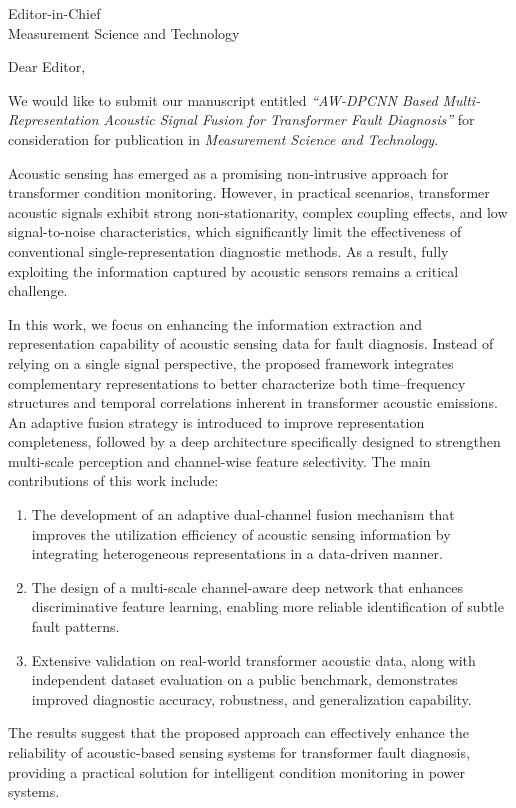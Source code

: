 \documentclass[a4paper,12pt]{letter}
\date{\today}
\begin{document}
\begin{letter}
{Editor-in-Chief \\
	Measurement Science and Technology}
\opening{Dear Editor,}

We would like to submit our manuscript entitled \textit{``AW-DPCNN Based Multi-Representation Acoustic Signal Fusion for Transformer Fault Diagnosis''} for consideration for publication in \textit{Measurement Science and Technology}.

Acoustic sensing has emerged as a promising non-intrusive approach for transformer condition monitoring. However, in practical scenarios, transformer acoustic signals exhibit strong non-stationarity, complex coupling effects, and low signal-to-noise characteristics, which significantly limit the effectiveness of conventional single-representation diagnostic methods. As a result, fully exploiting the information captured by acoustic sensors remains a critical challenge.

In this work, we focus on enhancing the information extraction and representation capability of acoustic sensing data for fault diagnosis. Instead of relying on a single signal perspective, the proposed framework integrates complementary representations to better characterize both time–frequency structures and temporal correlations inherent in transformer acoustic emissions. An adaptive fusion strategy is introduced to improve representation completeness, followed by a deep architecture specifically designed to strengthen multi-scale perception and channel-wise feature selectivity. The main contributions of this work include:
\begin{enumerate}
	\item The development of an adaptive dual-channel fusion mechanism that improves the utilization efficiency of acoustic sensing information by integrating heterogeneous representations in a data-driven manner.
	\item The design of a multi-scale channel-aware deep network that enhances discriminative feature learning, enabling more reliable identification of subtle fault patterns.
	\item Extensive validation on real-world transformer acoustic data, along with independent dataset evaluation on a public benchmark, demonstrates improved diagnostic accuracy, robustness, and generalization capability.
\end{enumerate}

The results suggest that the proposed approach can effectively enhance the reliability of acoustic-based sensing systems for transformer fault diagnosis, providing a practical solution for intelligent condition monitoring in power systems.


\end{letter}
\end{document}
